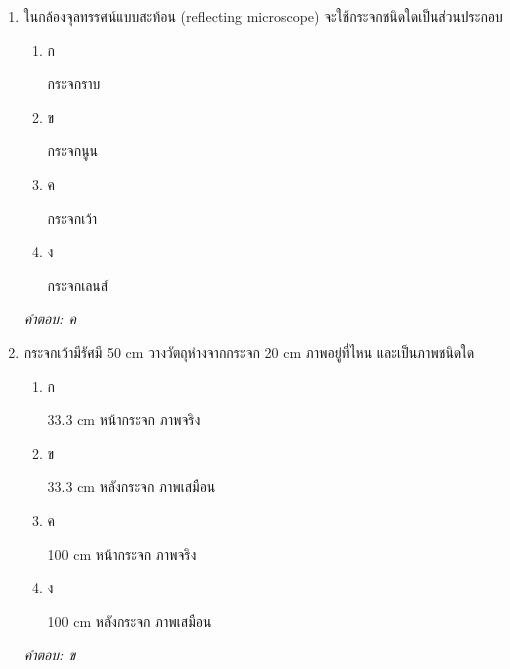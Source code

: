 \documentclass[12pt]{article}
\begin{document}
\begin{enumerate}[label=\arabic*., itemsep=0.5\baselineskip, topsep=0.5\baselineskip, leftmargin=*]
\item ในกล้องจุลทรรศน์แบบสะท้อน (reflecting microscope) จะใช้กระจกชนิดใดเป็นส่วนประกอบ
\begin{enumerate}[label=\alph*)., itemsep=0.3\baselineskip, topsep=0.3\baselineskip]
\item ก\ 
\begin{minipage}[t]{0.9\linewidth}
\raggedright กระจกราบ
\end{minipage}
\item ข\ 
\begin{minipage}[t]{0.9\linewidth}
\raggedright กระจกนูน
\end{minipage}
\item ค\ 
\begin{minipage}[t]{0.9\linewidth}
\raggedright กระจกเว้า
\end{minipage}
\item ง\ 
\begin{minipage}[t]{0.9\linewidth}
\raggedright กระจกเลนส์
\end{minipage}
\end{enumerate}
\vspace{-0.3\baselineskip}
\begin{small}
\textit{คำตอบ: ค}
\end{small}

\item กระจกเว้ามีรัศมี 50 cm วางวัตถุห่างจากกระจก 20 cm ภาพอยู่ที่ไหน และเป็นภาพชนิดใด
\begin{enumerate}[label=\alph*)., itemsep=0.3\baselineskip, topsep=0.3\baselineskip]
\item ก\ 
\begin{minipage}[t]{0.9\linewidth}
\raggedright 33.3 cm หน้ากระจก ภาพจริง
\end{minipage}
\item ข\ 
\begin{minipage}[t]{0.9\linewidth}
\raggedright 33.3 cm หลังกระจก ภาพเสมือน
\end{minipage}
\item ค\ 
\begin{minipage}[t]{0.9\linewidth}
\raggedright 100 cm หน้ากระจก ภาพจริง
\end{minipage}
\item ง\ 
\begin{minipage}[t]{0.9\linewidth}
\raggedright 100 cm หลังกระจก ภาพเสมือน
\end{minipage}
\end{enumerate}
\vspace{-0.3\baselineskip}
\begin{small}
\textit{คำตอบ: ข}
\end{small}


\end{enumerate}
\end{document}
